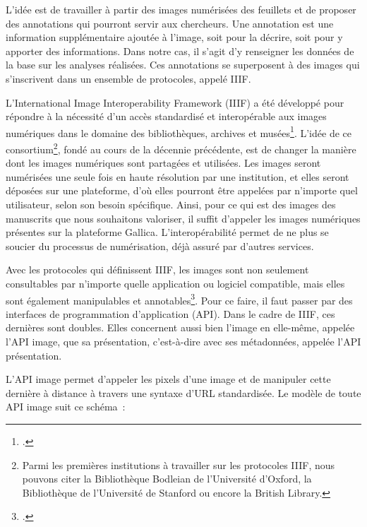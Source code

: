 L’idée est de travailler à partir des images numérisées des feuillets et de proposer des annotations qui pourront servir aux chercheurs. Une annotation est une information supplémentaire ajoutée à l'image, soit pour la décrire, soit pour y apporter des informations. Dans notre cas, il s’agit d’y renseigner les données de la base sur les analyses réalisées. Ces annotations se superposent à des images qui s’inscrivent dans un ensemble de protocoles, appelé IIIF.\par
L'International Image Interoperability Framework (IIIF) a été développé pour répondre à la nécessité d'un accès standardisé et interopérable aux images numériques dans le domaine des bibliothèques, archives et musées\footcite{noauthor_international_2024}. L’idée de ce consortium\footnote{Parmi les premières institutions à travailler sur les protocoles IIIF, nous pouvons citer la Bibliothèque Bodleian de l'Université d'Oxford, la Bibliothèque de l'Université de Stanford ou encore la British Library.}, fondé au cours de la décennie précédente, est de changer la manière dont les images numériques sont partagées et utilisées. Les images seront numérisées une seule fois en haute résolution par une institution, et elles seront déposées sur une plateforme, d’où elles pourront être appelées par n’importe quel utilisateur, selon son besoin spécifique. Ainsi, pour ce qui est des images des manuscrits que nous souhaitons valoriser, il suffit d’appeler les images numériques présentes sur la plateforme Gallica. L’interopérabilité permet de ne plus se soucier du processus de numérisation, déjà assuré par d’autres services.\\\par
Avec les protocoles qui définissent IIIF, les images sont non seulement consultables par n’importe quelle application ou logiciel compatible, mais elles sont également manipulables et annotables\footcite[La présentation de IIIF qui suit doit beaucoup à deux sites internet de vulgarisation. Le premier est le workbench de Glen Robson, le second est la documentation proposée Régis Robineau pour Biblissima][]{robson_iiif_nodate,biblissima_quest-ce_nodate}. Pour ce faire, il faut passer par des interfaces de programmation d’application (API). Dans le cadre de IIIF, ces dernières sont doubles. Elles concernent aussi bien l’image en elle-même, appelée l’API image, que sa présentation, c’est-à-dire avec ses métadonnées, appelée l’API présentation.\par
L’API image permet d’appeler les pixels d’une image et de manipuler cette dernière à distance à travers une syntaxe d’URL standardisée. Le modèle de toute API image suit ce schéma~:\par
